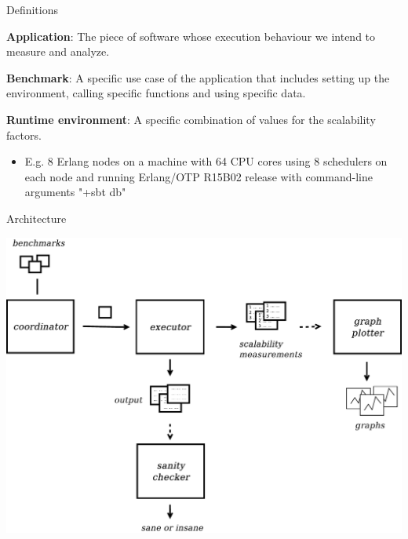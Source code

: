 \documentclass{beamer}
\begin{document}
\begin{frame}[t]{Definitions}

	\vspace{5pt}
	{\bf Application}: The \textcolor{burgundy}{piece of software} whose execution behaviour we intend to measure and analyze.

    \vspace{5pt}
	{\bf Benchmark}: A specific \textcolor{burgundy}{use case} of the \textcolor{burgundy}{application} that includes setting up the environment, calling specific functions and using specific data.

    \vspace{5pt}
	{\bf Runtime environment}: A specific combination of values for the \textcolor{burgundy}{scalability factors}.
	\begin{itemize}
		\item E.g. 8 \textcolor{burgundy}{Erlang nodes} on a machine with 64 \textcolor{burgundy}{CPU cores} using 8 \textcolor{burgundy}{schedulers} on each node and running Erlang/OTP R15B02 \textcolor{burgundy}{release} with \textcolor{burgundy}{command-line arguments} "+sbt db" 
	\end{itemize}
\end{frame}

\begin{frame}[t]{Architecture}
	\begin{center}
		\includegraphics[width=0.8\linewidth]{figures/architecture.pdf}
	\end{center}
\end{frame}
\end{document}
